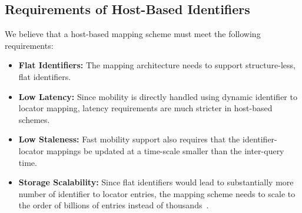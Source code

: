 
 \subsection{Requirements of Host-Based Identifiers}

We believe that a host-based mapping scheme must meet the following
requirements:

 \begin{itemize}
 	\item
  {\bf Flat Identifiers:} The mapping architecture needs to support
  structure-less, flat identifiers. %

 	\item
 {\bf Low Latency:} Since mobility is directly handled using dynamic
 identifier to locator mapping, latency requirements are much stricter
 in host-based schemes. %

 	\item
 {\bf Low Staleness:} Fast mobility support also requires that the
 identifier-locator mappings be updated at a time-scale smaller than
 the inter-query time.%

 	\item
 {\bf Storage Scalability:} Since flat identifiers would lead to
 substantially more number of identifier to locator entries, the
 mapping scheme needs to scale to the order of billions of entries
 instead of thousands~\cite{cisco-2010}.
 \end{itemize}

